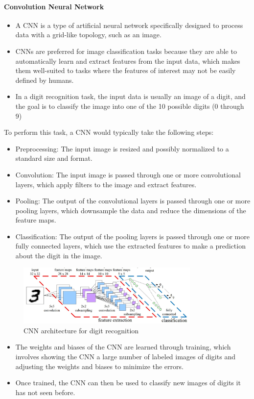 \STANDARD{\insertsection}
{ 
	\framesubtitle{Convolution Neural Network}
	\begin{itemize}
	\item A CNN is a type of artificial neural network specifically designed to process data with a grid-like topology, such as an image. 
	\item CNNs are preferred for image classification tasks because they are able to automatically learn and extract features from the input data, which makes them well-suited to tasks where the features of interest may not be easily defined by humans.
	\item In a digit recognition task, the input data is usually an image of a digit, and the goal is to classify the image into one of the 10 possible digits (0 through 9)
	
	\end{itemize}
To perform this task, a CNN would typically take the following steps:
\begin{itemize}
\item Preprocessing: The input image is resized and possibly normalized to a standard size and format.
	
\item Convolution: The input image is passed through one or more convolutional layers, which apply filters to the image and extract features.
	
\item Pooling: The output of the convolutional layers is passed through one or more pooling layers, which downsample the data and reduce the dimensions of the feature maps.
	
\item Classification: The output of the pooling layers is passed through one or more fully connected layers, which use the extracted features to make a prediction about the digit in the image.
\end{itemize}
\begin{figure}  [!h]
	\begin{center}
		\includegraphics[width=9cm]{images/CnnLayers}
		\caption{CNN architecture for digit recognition}
	\end{center}
\end{figure}
\begin{itemize}
	\item The weights and biases of the CNN are learned through training, which involves showing the CNN a large number of labeled images of digits and adjusting the weights and biases to minimize the errors.\\
	\item Once trained, the CNN can then be used to classify new images of digits it has not seen before.
\end{itemize}
}

